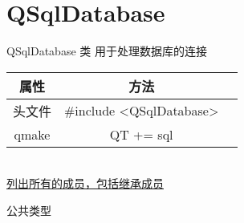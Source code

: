 \chapter{QSqlDatabase}
QSqlDatabase 类 用于处理数据库的连接

\begin{tabular}{|c|c|p{1.5cm}|}
	\hline
	属性 & 方法 \\
	\hline
	头文件 & \#include <QSqlDatabase>\\      
	\hline
	qmake & QT += sql\\      
	\hline
\end{tabular}\\

\href{https://doc.qt.io/qt-5/qsqldatabase-members.html}{列出所有的成员，包括继承成员}

公共类型

